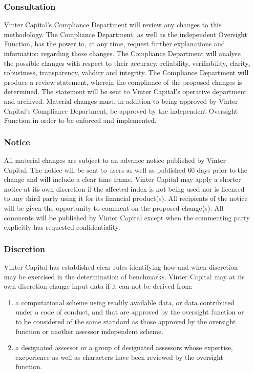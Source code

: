 \documentclass{article}
\begin{document}
\subsubsection{Consultation}
Vinter Capital’s Compliance Department will review any changes to this methodology. The Compliance Department, as well as the independent Oversight Function, has the power to, at any time, request further explanations and information regarding those changes. The Compliance Department will analyse the possible changes with respect to their accuracy, reliability, verifiability, clarity, robustness, transparency, validity and integrity. The Compliance Department will produce a review statement, wherein the compliance of the proposed changes is determined. The statement will be sent to Vinter Capital’s operative department and archived. Material changes must, in addition to being approved by Vinter Capital’s Compliance Department, be approved by the independent Oversight Function in order to be enforced and implemented. 
\subsubsection{Notice}
All material changes are subject to an advance notice published by Vinter Capital. The notice will be sent to users as well as published 60 days prior to the change and will include a clear time frame. Vinter Capital may apply a shorter notice at its own discretion if the affected index is not being used nor is licensed to any third party using it for its financial product(s). All recipients of the notice will be given the opportunity to comment on the proposed change(s). All comments will be published by Vinter Capital except when the commenting party explicitly has requested confidentiality. 

\subsubsection{Discretion}
Vinter Capital has established clear rules identifying how and when discretion
may be exercised in the determination of benchmarks. Vinter Capital may
at its own discretion change input data if it can not be derived from:

\begin{enumerate}[label=\alph*)]
\item
a computational scheme using readily available data, or data contributed under a code of conduct, and that are approved by the oversight function or to be considered of the same standard as those approved by the oversight function or another assessor independent scheme. 
\item a designated assessor or a group of designated assessors whose expertise, excperience as well as characters have been reviewed by the oversight function.  
\end{enumerate}
\end{document}
